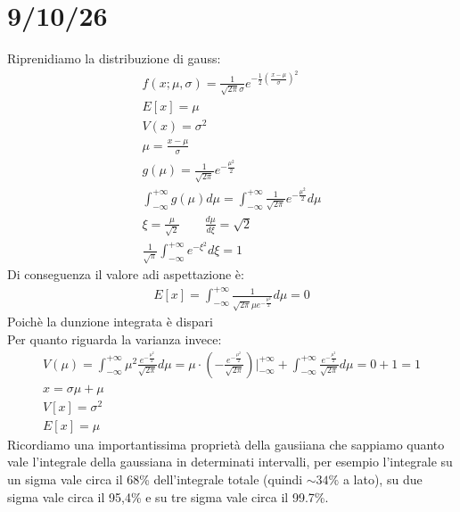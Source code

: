 \documentclass[a4paper, oneside]{article}
\begin{document}
\section{9/10/26}
Riprenidiamo la distribuzione di gauss:
\begin{gather*}
    f(x; \mu, \sigma) = \frac{1}{\sqrt{2 \pi} \sigma} e^{-\frac{1}{2} \left(\frac{x - \mu}{\sigma}\right)^2}\\
    E[x] = \mu\\
    V(x) = \sigma^2\\
    \mu = \frac{x - \mu}{\sigma} \\
    g(\mu) = \frac{1}{\sqrt{2 \pi}} e^{-\frac{\mu^2}{2}}\\
    \int_{-\infty}^{+\infty} g(\mu) d\mu = \int_{-\infty}^{+\infty} \frac{1}{\sqrt{2 \pi}} e^{-\frac{\mu^2}{2}} d\mu\\
    \xi = \frac{\mu}{\sqrt{2}} \qquad \frac{d\mu}{d\xi} = \sqrt{2} \\
    \frac{1}{\sqrt{\pi}} \int_{-\infty}^{+\infty} e^{-\xi^2} d \xi = 1
\end{gather*}
Di conseguenza il valore adi aspettazione è:
\begin{gather*}
    E[x] = \int_{-\infty}^{+\infty} \frac{1}{\sqrt{2 \pi} \mu e^{-\frac{\mu^2}{2}}} d\mu = 0
\end{gather*}
Poichè la dunzione integrata è dispari\\
Per quanto riguarda la varianza invece:
\begin{gather*}
    V(\mu) = \int_{-\infty}^{+\infty} \mu^2 \frac{e^{-\frac{\mu^2}{2}}}{\sqrt{2 \pi}} d\mu = \mu \cdot \left( -\frac{e^{-\frac{\mu^2}{2}}}{\sqrt{2 \pi}} \right) \big|_{-\infty}^{+\infty} + \int_{-\infty}^{+\infty} \frac{e^{-\frac{\mu^2}{2}}}{\sqrt{2 \pi}} d\mu = 0 + 1 = 1\\
    \boxed{x = \sigma \mu + \mu} \\V[x] = \sigma^2 \\ E[x] = \mu
\end{gather*}
Ricordiamo una importantissima proprietà della gausiiana che sappiamo quanto vale l'integrale della gaussiana in determinati intervalli, per esempio l'integrale su un sigma vale circa il 68\% dell'integrale totale (quindi $\sim 34\%$ a lato), su due sigma vale circa il 95,4\% e su tre sigma vale circa il 99.7\%.\\
\end{document}

